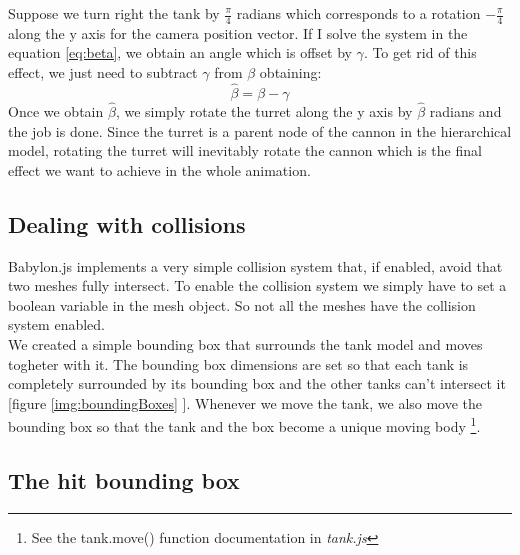 \documentclass[14pt]{article}
\begin{document}
Suppose we turn right the tank by \(\frac{\pi}{4}\) radians which corresponds to a rotation \(-\frac{\pi}{4}\) along the y axis for the camera position vector. If I solve the system  in the equation \ref{eq:beta}, we obtain an angle which is offset by \(\gamma\). To get rid of this effect, we just need to subtract \(\gamma\) from  \(\beta\) obtaining:
\[\hat{\beta} = \beta - \gamma\]
Once we obtain \(\hat{\beta}\), we simply rotate the turret along the y axis by \(\hat{\beta}\) radians and the job is done. Since the turret is a parent node of the cannon in the hierarchical model, rotating the turret will inevitably rotate the cannon which is the final effect we want to achieve in the whole animation. 
\subsection{Dealing with collisions}
Babylon.js implements a very simple collision system that, if enabled, avoid that two meshes fully intersect. To enable the collision system we simply have to set a boolean variable in the mesh object. So not all the meshes have the collision system enabled.\\ We created a simple bounding box that surrounds the tank model and moves togheter with it. The bounding box dimensions are set so that each tank is completely surrounded by its bounding box and the other tanks can't intersect it [figure \ref{img:boundingBoxes} ]. Whenever we move the tank, we also move the bounding box so that the tank and the box become a unique moving body \footnote{See the tank.move() function documentation in \textit{tank.js}}.

\subsection{The hit bounding box}
\end{document}
